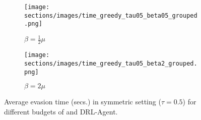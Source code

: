 \begin{figure}[htpb]
    \centering
    \begin{subfigure}[b]{0.49\linewidth}
        \texttt{[image: sections/images/time\_greedy\_tau05\_beta05\_grouped.png]}
        \caption{$\beta = \frac{1}{2}\mu$}
        \label{fig:time_greedy_tau05_beta05}
    \end{subfigure}
    \hfill
    \begin{subfigure}[b]{0.49\linewidth}
        \texttt{[image: sections/images/time\_greedy\_tau05\_beta2\_grouped.png]} 
        \caption{$\beta=2\mu$}
        \label{fig:time_greedy_tau05_beta2}
    \end{subfigure}
    \caption{Average evasion time (secs.) in symmetric setting ($\tau=0.5$) for different budgets of \method{} and DRL-Agent.}
    \label{fig:time2}
\end{figure}

